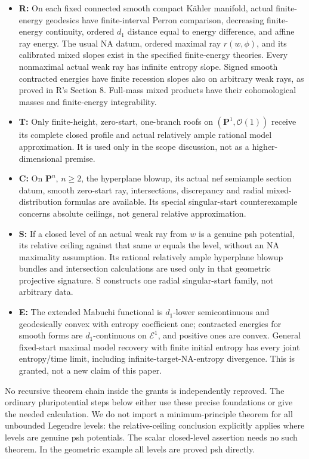 \documentclass[
  11pt,
]{article}
\providecommand{\tightlist}{%
  \setlength{\itemsep}{0pt}\setlength{\parskip}{0pt}}
\begin{document}
\begin{itemize}
\tightlist
\item
  \textbf{R:} On each fixed connected smooth compact Kähler manifold,
  actual finite-energy geodesics have finite-interval Perron comparison,
  decreasing finite-energy continuity, ordered \(d_1\) distance equal to
  energy difference, and affine ray energy. The usual NA datum, ordered
  maximal ray \(r(w,\phi)\), and its calibrated mixed slopes exist in
  the specified finite-energy theories. Every nonmaximal actual weak ray
  has infinite entropy slope. Signed smooth contracted energies have
  finite recession slopes also on arbitrary weak rays, as proved in R's
  Section 8. Full-mass mixed products have their cohomological masses
  and finite-energy integrability.
\item
  \textbf{T:} Only finite-height, zero-start, one-branch roofs on
  \((\mathbf P^1,\mathcal O(1))\) receive its complete closed profile
  and actual relatively ample rational model approximation. It is used
  only in the scope discussion, not as a higher-dimensional premise.
\item
  \textbf{C:} On \(\mathbf P^n\), \(n\ge2\), the hyperplane blowup, its
  actual nef semiample section datum, smooth zero-start ray,
  intersections, discrepancy and radial mixed-distribution formulas are
  available. Its special singular-start counterexample concerns absolute
  ceilings, not general relative approximation.
\item
  \textbf{S:} If a closed level of an actual weak ray from \(w\) is a
  genuine psh potential, its relative ceiling against that same \(w\)
  equals the level, without an NA maximality assumption. Its rational
  relatively ample hyperplane blowup bundles and intersection
  calculations are used only in that geometric projective signature. S
  constructs one radial singular-start family, not arbitrary data.
\item
  \textbf{E:} The extended Mabuchi functional is \(d_1\)-lower
  semicontinuous and geodesically convex with entropy coefficient one;
  contracted energies for smooth forms are \(d_1\)-continuous on
  \(\mathcal E^1\), and positive ones are convex. General fixed-start
  maximal model recovery with finite initial entropy has every joint
  entropy/time limit, including infinite-target-NA-entropy divergence.
  This is granted, not a new claim of this paper.
\end{itemize}

No recursive theorem chain inside the grants is independently reproved.
The ordinary pluripotential steps below either use these precise
foundations or give the needed calculation. We do not import a
minimum-principle theorem for all unbounded Legendre levels: the
relative-ceiling conclusion explicitly applies where levels are genuine
psh potentials. The scalar closed-level assertion needs no such theorem.
In the geometric example all levels are proved psh directly.
\end{document}
